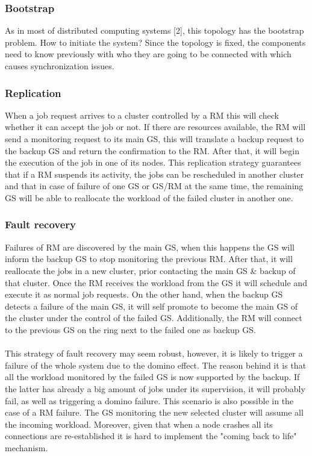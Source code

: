 \subsubsection{Bootstrap}
As in most of distributed computing systems [2], this topology has the bootstrap problem. How to initiate the system? Since the topology is fixed, the components need to know previously with who they are going to be connected with which causes synchronization issues.

\subsubsection{Replication}
When a job request arrives to a cluster controlled by a RM this will check whether it can accept the job or not. If there are resources available, the RM will send a monitoring request to its main GS, this will translate a backup request to the backup GS and return the confirmation to the RM. After that, it will begin the execution of the job in one of its nodes. This replication strategy guarantees that if a RM suspends its activity, the jobs can be rescheduled in another cluster and that in case of failure of one GS or GS/RM at the same time, the remaining GS will be able to reallocate the workload of the failed cluster in another one.

\subsubsection{Fault recovery}
Failures of RM are discovered by the main GS, when this happens the GS will inform the backup GS to stop monitoring the previous RM. After that, it will reallocate the jobs in a new cluster, prior contacting the main GS & backup of that cluster. Once the RM receives the workload from the GS it will schedule and execute it as normal job requests.
On the other hand, when the backup GS detects a failure of the main GS, it will self promote to become the main GS of the cluster under the control of the failed GS. Additionally, the RM will connect to the previous GS on the ring next to the failed one as backup GS.
\\\\
This strategy of fault recovery may seem robust, however, it is likely to trigger a failure of the whole system due to the domino effect. The reason behind it is that all the workload monitored by the failed GS is now supported by the backup. If the latter has already a big amount of jobs under its supervision, it will probably fail, as well as triggering a domino failure. This scenario is also possible in the case of a RM failure. The GS monitoring the new selected cluster will assume all the incoming workload. Moreover, given that when a node crashes all its connections are re-established it is hard to implement the "coming back to life" mechanism.


